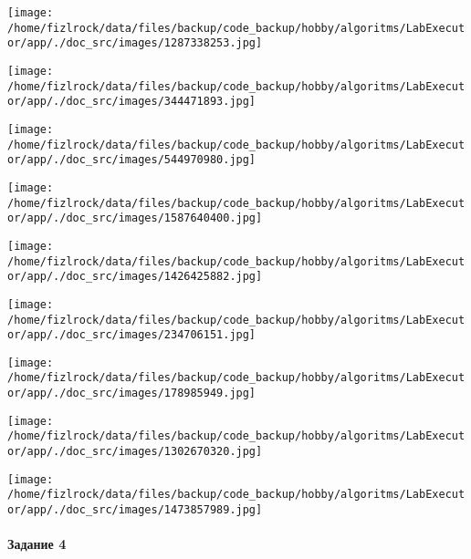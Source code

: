 \documentclass[a4paper, 12pt]{article}
\begin{document}
\texttt{[image: /home/fizlrock/data/files/backup/code\_backup/hobby/algoritms/LabExecutor/app/./doc\_src/images/1287338253.jpg]}

\texttt{[image: /home/fizlrock/data/files/backup/code\_backup/hobby/algoritms/LabExecutor/app/./doc\_src/images/344471893.jpg]}

\texttt{[image: /home/fizlrock/data/files/backup/code\_backup/hobby/algoritms/LabExecutor/app/./doc\_src/images/544970980.jpg]}

\texttt{[image: /home/fizlrock/data/files/backup/code\_backup/hobby/algoritms/LabExecutor/app/./doc\_src/images/1587640400.jpg]}

\texttt{[image: /home/fizlrock/data/files/backup/code\_backup/hobby/algoritms/LabExecutor/app/./doc\_src/images/1426425882.jpg]}

\texttt{[image: /home/fizlrock/data/files/backup/code\_backup/hobby/algoritms/LabExecutor/app/./doc\_src/images/234706151.jpg]}

\texttt{[image: /home/fizlrock/data/files/backup/code\_backup/hobby/algoritms/LabExecutor/app/./doc\_src/images/178985949.jpg]}

\texttt{[image: /home/fizlrock/data/files/backup/code\_backup/hobby/algoritms/LabExecutor/app/./doc\_src/images/1302670320.jpg]}

\texttt{[image: /home/fizlrock/data/files/backup/code\_backup/hobby/algoritms/LabExecutor/app/./doc\_src/images/1473857989.jpg]}
\pagebreak
\paragraph{Задание 4}
\end{document}

